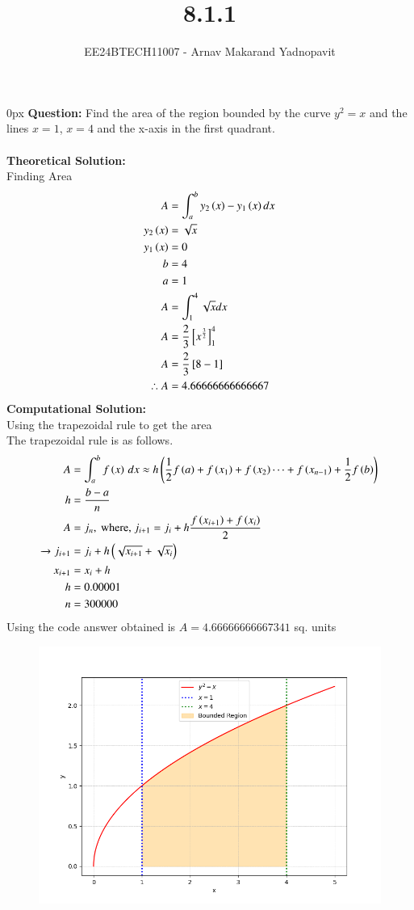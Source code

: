 \documentclass[journal,12pt,onecolumn]{IEEEtran}
\theoremstyle{remark}
\begin{document}
\title{8.1.1}
\author{EE24BTECH11007 - Arnav Makarand Yadnopavit}
\maketitle
\renewcommand{\thefigure}{\theenumi}
\renewcommand{\thetable}{\theenumi}
\parindent 0px \textbf{Question:} Find the area of the region bounded by the curve $y^2=x$ and the lines $x=1$, $x=4$ and the x-axis in the first quadrant.\\
\solution\\
\textbf{Theoretical Solution:}\\
Finding Area
\begin{align}
    A&=\int^{b}_{a}y_2\left(x\right)-y_1\left(x\right)dx\\
    y_2\left(x\right)&=\sqrt{x}\\
    y_1\left(x\right)&=0\\
    b&=4\\
    a&=1\\
    A&=\int^{4}_{1}\sqrt{x}dx\\
    A&=\frac{2}{3}{}\left[x^{\frac{3}{2}}\right]^4_1\\
    A&=\frac{2}{3}{}\left[8-1\right]\\
    \therefore A&=4.66666666666667
\end{align}
\textbf{Computational Solution:}\\
Using the trapezoidal rule to get the area\\
The trapezoidal rule is as follows.
\begin{align}
    A &= \int_a^b f\left(x\right)\, dx \approx h\left(\frac{1}{2}f\left(a\right) + f\left(x_1\right) + f\left(x_2\right) \cdots + f\left(x_{n-1}\right) + \frac{1}{2}f\left(b\right)\right)\\
    h &= \frac{b-a}{n}\\
    A &= j_n, \text{ where, } j_{i + 1} = j_i + h\frac{f\left(x_{i+1}\right) + f\left(x_i\right)}{2}\\ 
        \xrightarrow{} j_{i + 1} &= j_i + h\left(\sqrt{x_{i+1}}+\sqrt{x_{i}}\right)\\
    x_{i+1} &= x_i + h\\
    h&=0.00001\\
    n&=300000
\end{align}
Using the code answer obtained is $A=4.66666666667341$ sq. units
\begin{figure}[h]
    \centering
    \includegraphics[width=\columnwidth]{figs/fig.png}
 \end{figure}
\end{document}
